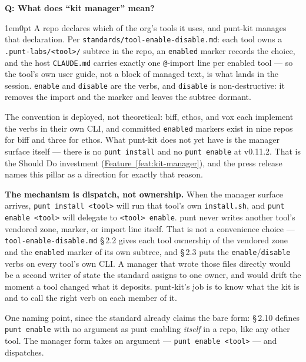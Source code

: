 \documentclass[11pt,letterpaper]{article}
\newcounter{faqnum}
\newenvironment{faqpair}[1]{%
  \needspace{4\baselineskip}%
  \vspace{0.5em}%
  \refstepcounter{faqnum}%
  \noindent\textbf{\color{SectionBlue}Q\thefaqnum: #1}\par\nopagebreak[4]%
  \vspace{0.2em}%
  \begin{adjustwidth}{1em}{0pt}%
  \setlength{\parindent}{0pt}%
}{%
  \end{adjustwidth}%
  \vspace{0.5em}%
}
\newcommand{\featureref}[1]{\hyperref[#1]{Feature~\ref*{#1}}}
\begin{document}
\begin{faqpair}{What does ``kit manager'' mean?}\label{faq:kit-manager}
  A repo declares which of the org's tools it uses, and punt-kit manages that
  declaration. Per \texttt{standards/tool-enable-disable.md}: each tool owns a
  \texttt{.punt-labs/<tool>/} subtree in the repo, an \texttt{enabled} marker
  records the choice, and the host \texttt{CLAUDE.md} carries exactly one
  \texttt{@}-import line per enabled tool --- so the tool's own user guide, not
  a block of managed text, is what lands in the session. \texttt{enable} and
  \texttt{disable} are the verbs, and \texttt{disable} is non-destructive: it
  removes the import and the marker and leaves the subtree dormant.

  The convention is deployed, not theoretical: biff, ethos, and vox each
  implement the verbs in their own CLI, and committed \texttt{enabled} markers
  exist in nine repos for biff and three for ethos. What punt-kit does not yet
  have is the manager surface itself --- there is no \texttt{punt install} and
  no \texttt{punt enable} at v0.11.2. That is the Should Do investment
  (\featureref{feat:kit-manager}), and the press release names this pillar as
  a direction for exactly that reason.

  \textbf{The mechanism is dispatch, not ownership.} When the manager surface
  arrives, \texttt{punt install <tool>} will run that tool's own
  \texttt{install.sh}, and \texttt{punt enable <tool>} will delegate to
  \texttt{<tool> enable}. punt never writes another tool's vendored zone,
  marker, or import line itself. That is not a convenience choice ---
  \texttt{tool-enable-disable.md} \S\,2.2 gives each tool ownership of the
  vendored zone and the \texttt{enabled} marker of its own subtree, and \S\,2.3
  puts the \texttt{enable}/\texttt{disable} verbs on every tool's own CLI. A
  manager that wrote those files directly would be a second writer of state
  the standard assigns to one owner, and would drift the moment a tool changed
  what it deposits. punt-kit's job is to know what the kit is and to call the
  right verb on each member of it.

  One naming point, since the standard already claims the bare form: \S\,2.10
  defines \texttt{punt enable} with no argument as punt enabling \emph{itself}
  in a repo, like any other tool. The manager form takes an argument ---
  \texttt{punt enable <tool>} --- and dispatches.
\end{faqpair}
\end{document}

